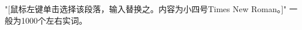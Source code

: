 \begin{englishabstract}
 
 "[鼠标左键单击选择该段落，输入替换之。内容为小四号Times New Roman。]" 一般为1000个左右实词。

\end{englishabstract}